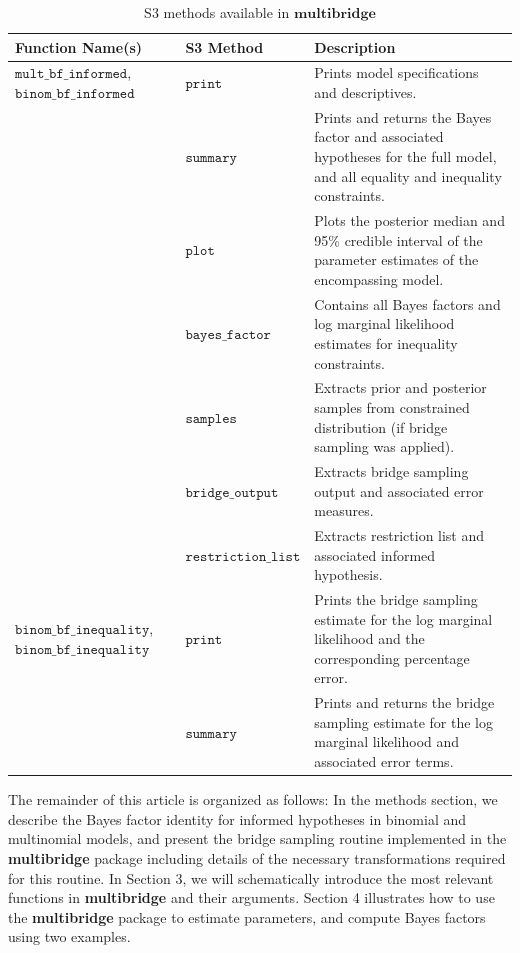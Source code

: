 \documentclass[
  english,
  man,floatsintext]{apa6}
\begin{document}
\begin{table}
\caption {S3 methods available in $\textbf{multibridge}$}
\label{table:s3_methods}
\begin{center}
\begin{tabular}{p{4cm}p{3.5cm}p{9cm}}
        \toprule
Function Name(s) & S3 Method & Description \\\midrule
$\texttt{mult\_bf\_informed}$, $\texttt{binom\_bf\_informed}$ & $\texttt{print}$ & Prints model specifications and descriptives. \\
 & $\texttt{summary}$ &  Prints and returns the Bayes factor and associated hypotheses for the full model, and all equality and inequality constraints.\\
  & $\texttt{plot}$ &  Plots the posterior median and 95\% credible interval of the parameter estimates of the encompassing model.\\
 & $\texttt{bayes\_factor}$ & Contains all Bayes factors and log marginal likelihood estimates for inequality constraints.\\
 & $\texttt{samples}$ & Extracts prior and posterior samples from constrained distribution (if bridge sampling was applied). \\
& $\texttt{bridge\_output}$    &  Extracts bridge sampling output and associated error measures.\\
& $\texttt{restriction\_list}$ & Extracts restriction list and associated informed hypothesis. \\
$\texttt{binom\_bf\_inequality}$, $\texttt{binom\_bf\_inequality}$  & $\texttt{print}$ & Prints the bridge sampling estimate for the log marginal likelihood and the corresponding percentage error. \\
& $\texttt{summary}$ & Prints and returns the bridge sampling estimate for the log marginal likelihood and associated error terms.\\
\bottomrule
\end{tabular}
\end{center}
\end{table}

The remainder of this article is organized as follows: In the methods section, we describe the Bayes factor identity for informed hypotheses in binomial and multinomial models, and present the bridge sampling routine implemented in the \textbf{multibridge} package including details of the necessary transformations required for this routine. In Section 3, we will schematically introduce the most relevant functions in \textbf{multibridge} and their arguments. Section 4 illustrates how to use the \textbf{multibridge} package to estimate parameters, and compute Bayes factors using two examples.
\end{document}
